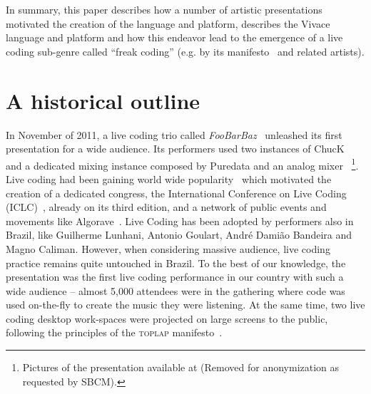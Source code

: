 \documentclass[12pt,times,twocolumn]{article}
\begin{document}
In summary, this paper describes how
a number of artistic presentations motivated the creation of the language and platform,
describes the Vivace language and platform and how this endeavor
lead to the emergence of a live coding sub-genre
called ``freak coding'' (e.g. by its manifesto~\cite{freak} and related artists).

\section{A historical outline} %
In November of 2011, a live coding trio called
\textit{FooBarBaz}~\cite{foobarbaz} unleashed its first presentation
for a wide audience. Its performers used two instances of
ChucK~\cite{wang2003chuck} and a dedicated mixing instance composed by Puredata and an analog
mixer
~\footnote{Pictures of the presentation available at
  (Removed for anonymization as requested by SBCM).}.
  Live coding had been gaining world wide popularity~\cite{nilson2007live,
  collins2003live, brown2007a, collins2011live} which motivated the creation of a dedicated
  congress, the International Conference on Live Coding (ICLC)~\cite{iclc},
  already on its third edition, and a network of
  public events and movements like Algorave~\cite{algorave}. Live Coding has been adopted by
  performers also in Brazil, like Guilherme Lunhani, Antonio Goulart, André
  Damião Bandeira and Magno Caliman. However, when considering massive
  audience, live coding practice remains quite untouched in Brazil.
To the best of our knowledge, the presentation
was the first live coding performance in our country with such a wide audience -- almost 5,000
attendees were in the gathering where code was used on-the-fly to
create the music they were listening.
At the same time, two live coding desktop work-spaces were projected on large screens to the
public, following the principles of the \textsc{toplap} manifesto~\cite{ward2004live}.
\end{document}
